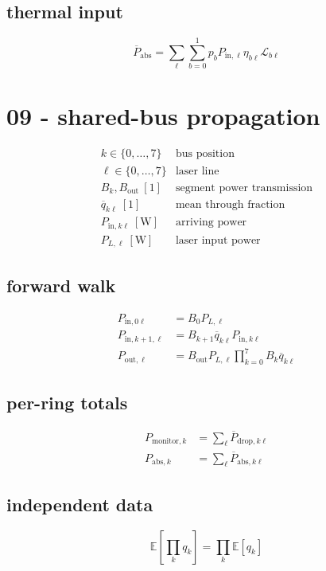 \subsection*{thermal input}
\[
\displaystyle \overline P_{\mathrm{abs}}=\sum_{\ell}\sum_{b=0}^{1}p_bP_{\mathrm{in},\ell}\eta_{b\ell}\mathcal L_{b\ell}
\]

\clearpage
\section*{09 - shared-bus propagation}

\[
\begin{array}{ll}k\in\{0,\ldots,7\}&\text{bus position}\\[0.6em]\ell\in\{0,\ldots,7\}&\text{laser line}\\[0.6em]B_k,B_{\mathrm{out}}\ [1]&\text{segment power transmission}\\[0.6em]\overline q_{k\ell}\ [1]&\text{mean through fraction}\\[0.6em]P_{\mathrm{in},k\ell}\ [\mathrm W]&\text{arriving power}\\[0.6em]P_{L,\ell}\ [\mathrm W]&\text{laser input power}\end{array}
\]

\subsection*{forward walk}
\[
\displaystyle \begin{aligned}P_{\mathrm{in},0\ell}&=B_0P_{L,\ell}\\P_{\mathrm{in},k+1,\ell}&=B_{k+1}\overline q_{k\ell}P_{\mathrm{in},k\ell}\\P_{\mathrm{out},\ell}&=B_{\mathrm{out}}P_{L,\ell}\prod_{k=0}^{7}B_k\overline q_{k\ell}\end{aligned}
\]

\subsection*{per-ring totals}
\[
\displaystyle \begin{aligned}P_{\mathrm{monitor},k}&=\sum_\ell\overline P_{\mathrm{drop},k\ell}\\P_{\mathrm{abs},k}&=\sum_\ell\overline P_{\mathrm{abs},k\ell}\end{aligned}
\]

\subsection*{independent data}
\[
\displaystyle \mathbb E\!\left[\prod_k q_k\right]=\prod_k\mathbb E[q_k]
\]

